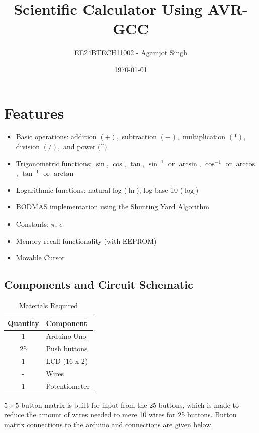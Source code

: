 \documentclass[a4paper,12pt]{article}
\title{Scientific Calculator Using AVR-GCC}
\author{EE24BTECH11002 - Agamjot Singh}
\date{\today}
\begin{document}
\maketitle

\section*{Features}
\begin{itemize}
    \item Basic operations: addition $(+),$ subtraction $(-),$ multiplication $(*)$, division $(/),$ and power $($\textasciicircum$)$
    \item Trigonometric functions: $\sin$, $\cos$, $\tan$, $\sin^{-1}$ or $\arcsin$, $\cos^{-1}$ or $\arccos$, $\tan^{-1}$ or $\arctan$
    \item Logarithmic functions: natural log ($\ln$), log base 10 ($\log$)
    \item BODMAS implementation using the Shunting Yard Algorithm
    \item Constants: $\pi$, $e$
    \item Memory recall functionality (with EEPROM)
    \item Movable Cursor
\end{itemize}


\subsection*{Components and Circuit Schematic}

\begin{table}[H]
\centering
\begin{tabular}{|c|l|}
\hline
\textbf{Quantity} & \textbf{Component} \\
\hline
1 & Arduino Uno\\
\hline
25 & Push buttons \\
\hline
1 & LCD (16 x 2) \\
\hline
- & Wires \\
\hline
1 & Potentiometer \\
\hline
\end{tabular}
\caption{Materials Required}
\label{tab:materials}
\end{table}

$5 \times 5$ button matrix is built for input from the 25 buttons, which is made to reduce the amount of wires needed to mere 10 wires for 25 buttons. Button matrix connections to the arduino and connections are given below.
\end{document}
